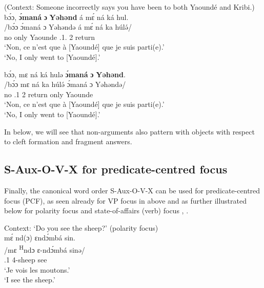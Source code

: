 \documentclass[output=paper,colorlinks,citecolor=brown
]{langscibook}
\begin{document}
\ea (Context: Someone incorrectly says you have been to both Yaoundé and Kribi.) 
\ea
\label{onlyyaoundeleft}
\glll
{\db}bɔ́ɔ,	\textbf{ɔ́maná}	\textbf{ɔ}	\textbf{Yəhənd}	á	mɛ́ ná ká hul. \\
/bɔ́ɔ	ɔ́maná	ɔ	Yəhəndə	á	mɛ́ ná ka  húlə́/ \\
{\db}no	only	\PREP{}	Yaounde	\COP{}	\SM{}.1\SG{}.\REL{} \PST{}2{} \AND{} return \\
\glt
`Non, ce n'est que à [Yaoundé]\textsubscript{\FOC{}} que je suis parti(e).' \\ `No, I only went to [Yaoundé]\textsubscript{\FOC{}}.' \jambox*{[JO 1607] }

\ex
\label{onlyyaounderight}
\glll
{\db}bɔ́ɔ,	mɛ ná \ds{}ká	hulə	\textbf{ɔ́maná}	\textbf{ɔ} \textbf{Yəhənd}. \\
/bɔ́ɔ	mɛ ná ka	húlə́	ɔ́maná	ɔ Yəhəndə/ \\
{\db}no \SM{}.1\SG{} \PST{}2{} \AND{}	return	only	\PREP{} Yaounde \\
\glt
`Non, ce n'est que à [Yaoundé]\textsubscript{\FOC{}} que je suis parti(e).' \\ `No, I only went to [Yaoundé]\textsubscript{\FOC{}}.' \jambox*{[JO 1608] } 

\z
\z

In  below, we will see that non-arguments also pattern with objects with respect to cleft formation and fragment answers.

\subsection{S-Aux-O-V-X for predicate-centred focus}
Finally, the canonical word order S-Aux-O-V-X can be used for predicate-centred focus (PCF), as seen already for VP focus in  above and as further illustrated below for polarity focus  and state-of-affairs (verb) focus , .

\ea
\label{seesheepQ}
Context: `Do you see the sheep?' (polarity focus) \\
\glll
{\db}mɛ́ nd(ɔ)	ɛndɔ́mbá	sin. \\
/mɛ \textsuperscript{H}ndɔ	ɛ-ndɔ́mbá	sinə/ \\
{\db}\SM{}.1\SG{} \PRS{}	4-sheep	see \\
\glt
`Je vois les moutons.' \\ `I see the sheep.' \jambox*{[EO 695] }
\end{document}
